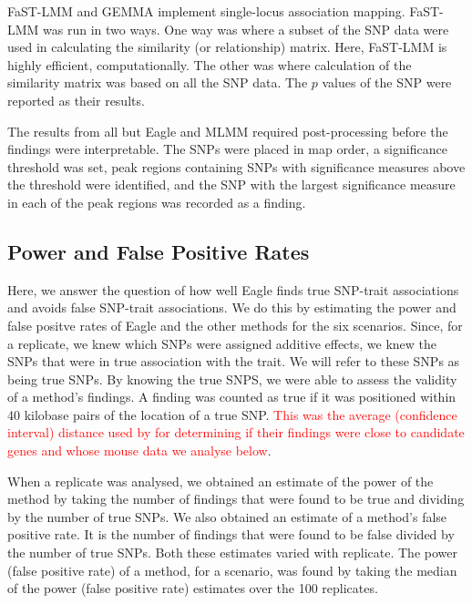 \documentclass{bioinfo}
\begin{document}
FaST-LMM and GEMMA implement single-locus association mapping. FaST-LMM was run in two ways. One way was where a subset of the SNP data were used in calculating the similarity (or relationship) matrix. Here, FaST-LMM is highly efficient, computationally. The other was where calculation of the similarity matrix was based on all the SNP data. The $p$ values of the SNP were reported as their results. 


The results from all but Eagle and MLMM required post-processing before the findings were interpretable.  The SNPs were placed in map order, 
a significance threshold was set, peak regions containing SNPs with significance measures above the threshold were identified, and the SNP with the largest 
significance measure in each of the peak regions was recorded as a finding. 


 



\subsection{Power and False Positive Rates}

Here, we answer the question of how well Eagle finds true SNP-trait associations and avoids false SNP-trait associations. We do this by estimating the power and false positve rates of Eagle and the other methods for the six scenarios.  Since, for a replicate, we knew which SNPs were assigned additive effects, we knew the SNPs that were in true association with the trait. We will refer to these SNPs as being
true SNPs. By knowing the true SNPS, we were able to assess the validity of a method's findings. A  finding was counted as true if it was positioned within 40 kilobase pairs of the location of a true SNP.  \textcolor{red}{This was the average (confidence interval) distance used by
\cite{nicod2016genome} for determining if their findings were close to candidate genes and whose mouse data we analyse below}. 

When a replicate was analysed, we obtained an estimate of the power of the method by taking  the number of findings that were found to be  true and dividing by the 
number of true SNPs. We also obtained an estimate of a method's false positive rate. It is the number of findings that were found to be false divided by the number of true SNPs.  Both these estimates varied with replicate. 
The power (false positive rate) of a method, for a scenario, was found by taking the median of the power (false positive rate) estimates over the 100 replicates. 
\end{document}

